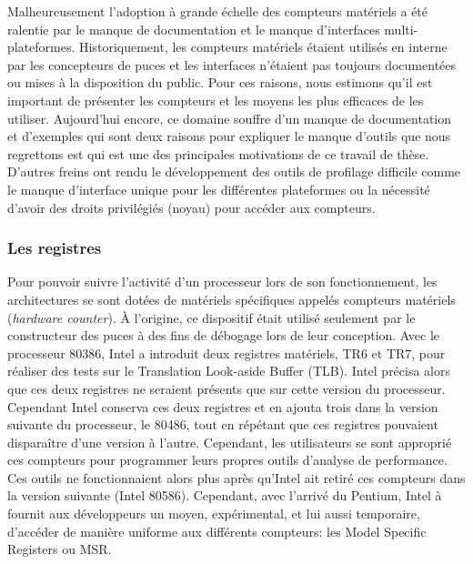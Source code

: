     Malheureusement l'adoption à grande échelle des compteurs matériels a été ralentie par le manque de documentation et le manque d'interfaces multi-plateformes. Historiquement, les compteurs matériels étaient utilisés en interne par les concepteurs de puces et les interfaces n'étaient pas toujours documentées ou mises à la disposition du public. Pour ces raisons, nous estimons qu'il est important de présenter les compteurs et les moyens les plus efficaces de les utiliser. Aujourd'hui encore, ce domaine souffre d'un manque de documentation et d'exemples qui sont deux raisons pour expliquer le manque d'outils que nous regrettons est qui est une des principales motivations de ce travail de thèse. D'autres freins ont rendu le développement des outils de profilage difficile comme le manque d'interface unique pour les différentes plateformes ou la nécessité d'avoir des droits privilégiés (noyau) pour accéder aux compteurs. 
    
    

    \subsubsection{Les registres}
    
        Pour pouvoir suivre l'activité d'un processeur lors de son fonctionnement, les architectures se sont dotées de matériels spécifiques appelés compteurs matériels (\textit{hardware counter}). À l'origine, ce dispositif était utilisé seulement par le constructeur des puces à des fins de débogage lors de leur conception. Avec le processeur 80386, Intel a introduit deux registres matériels, TR6 et TR7, pour réaliser des tests sur le Translation Look-aside Buffer (TLB). Intel précisa alors que ces deux registres ne seraient présents que sur cette version du processeur. Cependant Intel conserva ces deux registres et en ajouta trois dans la version suivante du processeur, le 80486, tout en répétant que ces registres pouvaient disparaître d'une version à l'autre. Cependant, les utilisateurs se sont approprié ces compteurs pour programmer leurs propres outils d'analyse de performance. Ces outils ne fonctionnaient alors plus après qu'Intel ait retiré ces compteurs dans la version suivante (Intel 80586). Cependant, avec l'arrivé du Pentium, Intel à fournit aux développeurs un moyen, expérimental, et lui aussi temporaire, d'accéder de manière uniforme aux différents compteurs: les Model Specific Registers ou MSR.

